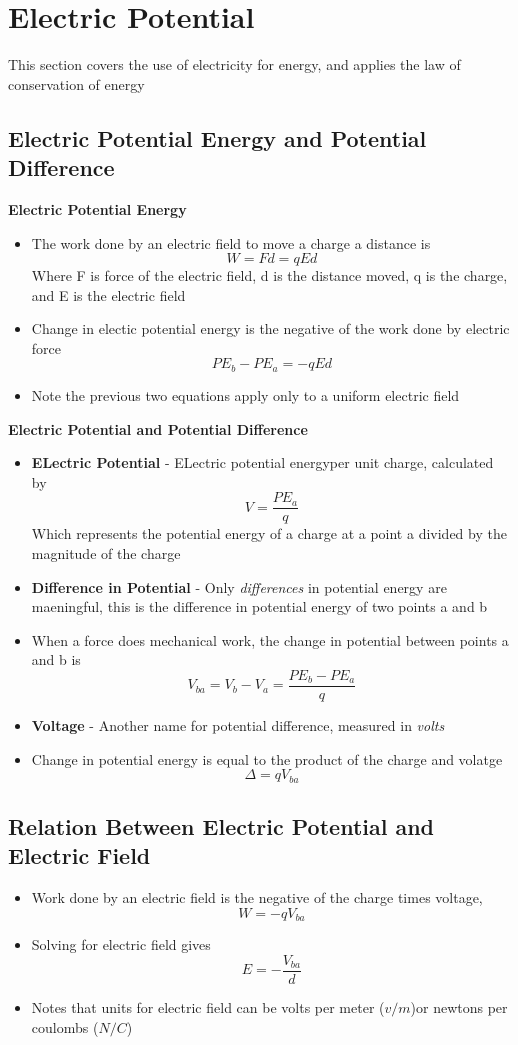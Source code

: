 \section{Electric Potential}
This section covers the use of electricity for energy, and applies the law of conservation of energy

\subsection{Electric Potential Energy and Potential Difference}
\textbf{Electric Potential Energy}
\begin{itemize}
    \item The work done by an electric field to move a charge a distance is \[W=Fd=qEd\] Where F is force of the electric field, d is the distance moved, q is the charge, and E is the electric field
    \item Change in electic potential energy is the negative of the work done by electric force \[PE_b-PE_a=-qEd\]
    \item Note the previous two equations apply only to a uniform electric field
\end{itemize}

\textbf{Electric Potential and Potential Difference}
\begin{itemize}
    \item \textbf{ELectric Potential} - ELectric potential energyper unit charge, calculated by \[V=\frac{PE_a}{q}\] Which represents the potential energy of a charge at a point a divided by the magnitude of the charge
    \item \textbf{Difference in Potential} - Only \emph{differences} in potential energy are maeningful, this is the difference in potential energy of two points a and b
    \item When a force does mechanical work, the change in potential between points a and b is \[V_{ba}=V_b-V_a=\frac{PE_b-PE_a}{q}\]
    \item \textbf{Voltage} - Another name for potential difference, measured in \emph{volts}
    \item Change in potential energy is equal to the product of the charge and volatge \[\Delta=qV_{ba}\]
\end{itemize}

\subsection{Relation Between Electric Potential and Electric Field}
\begin{itemize}
    \item Work done by an electric field is the negative of the charge times voltage, \[W=-qV_{ba}\]
    \item Solving for electric field gives \[E=-\frac{V_{ba}}{d}\] 
    \item Notes that units for electric field can be volts per meter (\(v/m\))or newtons per coulombs (\(N/C\))
\end{itemize}

